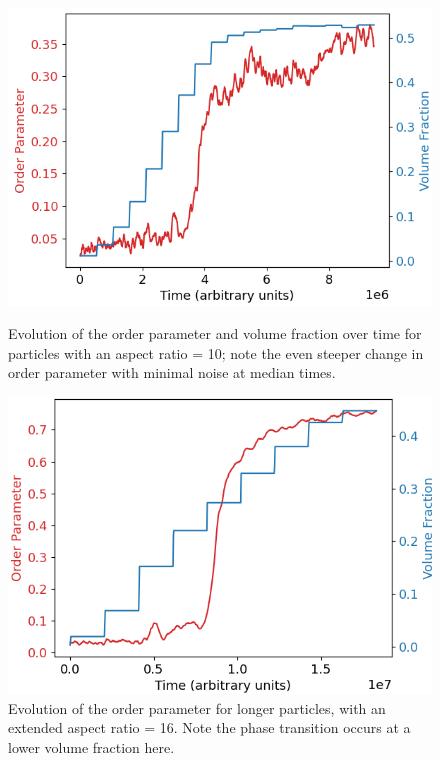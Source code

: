 \documentclass[11pt, a4paper]{article} %
\begin{document}
\begin{figure}[ht]
	\centering
	\begin{minipage}[b]{0.45\textwidth}
		\includegraphics[width=\linewidth]{Figures/order_and_volfrac_oblong2}
		\caption{Evolution of the order parameter and volume fraction over time for particles with an aspect ratio = 10; note the even steeper change in order parameter with minimal noise at median times.}
		\label{fig:oblong_order2}
	\end{minipage}
	\hfill
	\begin{minipage}[b]{0.45\textwidth}
		\includegraphics[width=\linewidth]{Figures/order_and_volfrac_longrods}
		\caption{Evolution of the order parameter for longer particles, with an extended aspect ratio = 16. Note the phase transition occurs at a lower volume fraction here.}
		\label{fig:oblong_order_long}
	\end{minipage}
\end{figure} 
\end{document}
